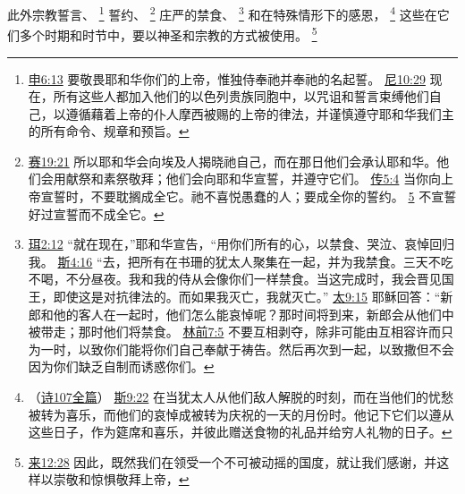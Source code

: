 \documentclass[12pt, a4paper, oneside]{ctexart}
\begin{document}
	此外宗教誓言、
	\footnote {
		\href{https://biblehub.com/deuteronomy/6-13.htm}{申6:13} 要敬畏耶和华你们的上帝，惟独侍奉祂并奉祂的名起誓。
		\href{https://biblehub.com/nehemiah/10-29.htm}{尼10:29} 现在，所有这些人都加入他们的以色列贵族同胞中，以咒诅和誓言束缚他们自己，以遵循藉着上帝的仆人摩西被赐的上帝的律法，并谨慎遵守耶和华我们主的所有命令、规章和预旨。
	}
	誓约、
	\footnote {
		\href{https://biblehub.com/isaiah/19-21.htm}{赛19:21} 所以耶和华会向埃及人揭晓祂自己，而在那日他们会承认耶和华。他们会用献祭和素祭敬拜；他们会向耶和华宣誓，并遵守它们。
		\href{https://biblehub.com/ecclesiastes/5-4.htm}{传5:4} 当你向上帝宣誓时，不要耽搁成全它。祂不喜悦愚蠢的人；要成全你的誓约。
		\href{https://biblehub.com/ecclesiastes/5-5.htm}{5} 不宣誓好过宣誓而不成全它。
	}
	庄严的禁食、
	\footnote {
		\href{https://biblehub.com/joel/2-12.htm}{珥2:12} “就在现在，”耶和华宣告，“用你们所有的心，以禁食、哭泣、哀悼回归我。
		\href{https://biblehub.com/esther/4-16.htm}{斯4:16} “去，把所有在书珊的犹太人聚集在一起，并为我禁食。三天不吃不喝，不分昼夜。我和我的侍从会像你们一样禁食。当这完成时，我会晋见国王，即使这是对抗律法的。而如果我灭亡，我就灭亡。”
		\href{https://biblehub.com/matthew/9-15.htm}{太9:15} 耶稣回答：“新郎和他的客人在一起时，他们怎么能哀悼呢？那时间将到来，新郎会从他们中被带走；那时他们将禁食。
		\href{https://biblehub.com/1_corinthians/7-5.htm}{林前7:5} 不要互相剥夺，除非可能由互相容许而只为一时，以致你们能将你们自己奉献于祷告。然后再次到一起，以致撒但不会因为你们缺乏自制而诱惑你们。
	}
	和在特殊情形下的感恩，
	\footnote {
		（\href{https://biblehub.com/niv/psalms/107.htm}{诗107全篇}）
		\href{https://biblehub.com/esther/9-22.htm}{斯9:22} 在当犹太人从他们敌人解脱的时刻，而在当他们的忧愁被转为喜乐，而他们的哀悼成被转为庆祝的一天的月份时。他记下它们以遵从这些日子，作为筵席和喜乐，并彼此赠送食物的礼品并给穷人礼物的日子。
	}
	这些在它们多个时期和时节中，要以神圣和宗教的方式被使用。
	\footnote {
		\href{https://biblehub.com/hebrews/12-28.htm}{来12:28} 因此，既然我们在领受一个不可被动摇的国度，就让我们感谢，并这样以崇敬和惊惧敬拜上帝，
	}
\end{document}
